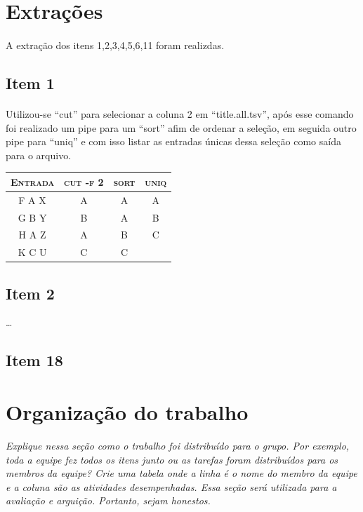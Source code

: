\documentclass[12pt]{article}
\begin{document}
\section{Extrações}

\paragraph{}
A extração dos itens 1,2,3,4,5,6,11 foram realizdas.

\subsection*{Item 1}

\paragraph{}
Utilizou-se ``cut'' para selecionar a coluna 2 em ``title.all.tsv'', após esse comando foi realizado um pipe para um ``sort'' afim de ordenar a seleção, em seguida outro pipe para ``uniq'' e com isso listar as entradas únicas dessa seleção como saída para o arquivo.

\begin{table}[!htb]
    \begin{tabular}{ c c c c }
        \textsc{Entrada} & \textsc{cut -f 2} & \textsc{sort} & \textsc{uniq} \\ 
        \hline
        F A X & A & A & A \\ 
        G B Y & B & A & B \\
        H A Z & A & B & C \\
        K C U & C & C &   \\
    \end{tabular}
\end{table}


\subsection*{Item 2}
\ldots

\subsection*{Item 18}

\section{Organização do trabalho}

\emph{Explique nessa seção como o trabalho foi distribuído para o grupo.
Por exemplo, toda a equipe fez todos os itens junto ou as tarefas foram 
distribuídos para os membros da equipe? Crie uma tabela onde a linha é o
nome do membro da equipe e a coluna são as atividades desempenhadas.
Essa seção será utilizada para a avaliação e arguição. Portanto, sejam
honestos.}
\end{document}
